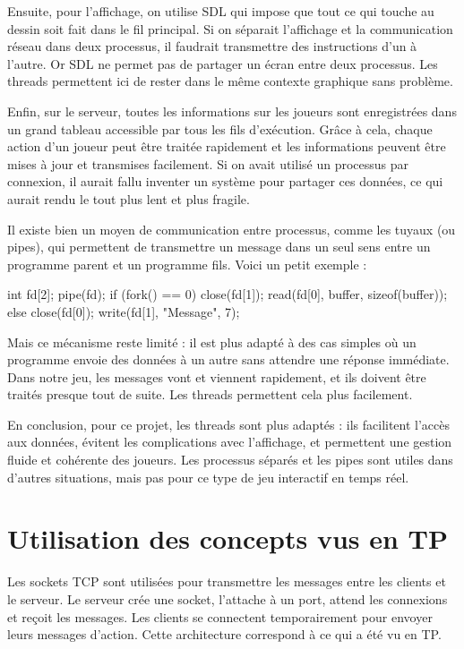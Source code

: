 \documentclass{article}
\begin{document}
Ensuite, pour l'affichage, on utilise SDL qui impose que tout ce qui touche au dessin soit fait dans le fil principal. Si on séparait l'affichage et la communication réseau dans deux processus, il faudrait transmettre des instructions d'un à l'autre. Or SDL ne permet pas de partager un écran entre deux processus. Les threads permettent ici de rester dans le même contexte graphique sans problème.

Enfin, sur le serveur, toutes les informations sur les joueurs sont enregistrées dans un grand tableau accessible par tous les fils d'exécution. Grâce à cela, chaque action d'un joueur peut être traitée rapidement et les informations peuvent être mises à jour et transmises facilement. Si on avait utilisé un processus par connexion, il aurait fallu inventer un système pour partager ces données, ce qui aurait rendu le tout plus lent et plus fragile.

Il existe bien un moyen de communication entre processus, comme les tuyaux (ou pipes), qui permettent de transmettre un message dans un seul sens entre un programme parent et un programme fils. Voici un petit exemple :

\begin{texC}
int fd[2];
pipe(fd);
if (fork() == 0) {
    close(fd[1]);
    read(fd[0], buffer, sizeof(buffer));
} else {
    close(fd[0]);
    write(fd[1], "Message", 7);
}
\end{texC}

Mais ce mécanisme reste limité : il est plus adapté à des cas simples où un programme envoie des données à un autre sans attendre une réponse immédiate. Dans notre jeu, les messages vont et viennent rapidement, et ils doivent être traités presque tout de suite. Les threads permettent cela plus facilement.

En conclusion, pour ce projet, les threads sont plus adaptés : ils facilitent l'accès aux données, évitent les complications avec l'affichage, et permettent une gestion fluide et cohérente des joueurs. Les processus séparés et les pipes sont utiles dans d'autres situations, mais pas pour ce type de jeu interactif en temps réel.

\section{Utilisation des concepts vus en TP}

Les sockets TCP sont utilisées pour transmettre les messages entre les clients et le serveur. Le serveur crée une socket, l'attache à un port, attend les connexions et reçoit les messages. Les clients se connectent temporairement pour envoyer leurs messages d'action. Cette architecture correspond à ce qui a été vu en TP.
\end{document}
